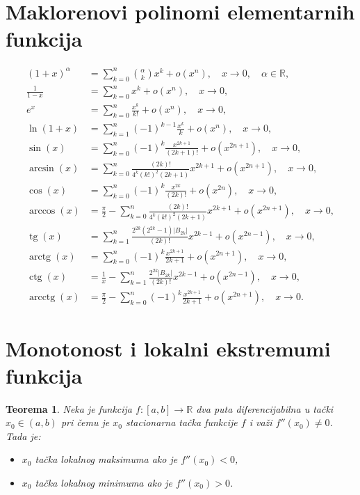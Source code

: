 \documentclass[a4paper,12pt]{article}
\theoremstyle{plain}
\newtheorem{theorem}{Teorema}[section]
\theoremstyle{definition}
\theoremstyle{remark}
\renewcommand{\tan}{\operatorname{tg}}
\renewcommand{\cot}{\operatorname{ctg}}
\renewcommand{\arctan}{\operatorname{arctg}}
\newcommand{\arccot}{\operatorname{arcctg}}
\begin{document}
\section{Maklorenovi polinomi elementarnih funkcija}
\begin{align*}
(1+x)^\alpha &= \sum_{k=0}^{n} \binom{\alpha}{k} x^k + o(x^n), \quad x \to 0, \quad \alpha \in \mathbb{R}, \\
\frac{1}{1-x} &= \sum_{k=0}^{n} x^k + o(x^n), \quad x \to 0, \\
e^x &= \sum_{k=0}^{n} \frac{x^k}{k!} + o(x^n), \quad x \to 0, \\
\ln(1+x) &= \sum_{k=1}^{n} (-1)^{k-1} \frac{x^k}{k} + o(x^n), \quad x \to 0, \\
\sin(x) &= \sum_{k=0}^{n} (-1)^k \frac{x^{2k+1}}{(2k+1)!} + o(x^{2n+1}), \quad x \to 0, \\
\arcsin(x) &= \sum_{k=0}^{n} \frac{(2k)!}{4^k (k!)^2 (2k+1)} x^{2k+1}
+ o(x^{2n+1}), \quad x \to 0, \\
\cos(x) &= \sum_{k=0}^{n} (-1)^k \frac{x^{2k}}{(2k)!} + o(x^{2n}), \quad x \to 0, \\
\arccos(x) &= \frac{\pi}{2}
- \sum_{k=0}^{n} \frac{(2k)!}{4^k (k!)^2 (2k+1)} x^{2k+1}
+ o(x^{2n+1}), \quad x \to 0, \\
\tan(x) &= \sum_{k=1}^{n}
\frac{2^{2k}(2^{2k}-1)|B_{2k}|}{(2k)!} x^{2k-1}
+ o(x^{2n-1}), \quad x \to 0, \\
\arctan(x) &= \sum_{k=0}^{n} (-1)^k \frac{x^{2k+1}}{2k+1}
+ o(x^{2n+1}), \quad x \to 0, \\
\cot(x) &= \frac{1}{x}
- \sum_{k=1}^{n}
\frac{2^{2k}|B_{2k}|}{(2k)!} x^{2k-1}
+ o(x^{2n-1}), \quad x \to 0, \\
\arccot(x) &= \frac{\pi}{2}
- \sum_{k=0}^{n} (-1)^k \frac{x^{2k+1}}{2k+1}
+ o(x^{2n+1}), \quad x \to 0.
\end{align*}

\section{Monotonost i lokalni ekstremumi funkcija}

\begin{theorem}
Neka je funkcija $f: [a, b] \to \mathbb{R}$ dva puta diferencijabilna u tački $x_0 \in (a, b)$ pri čemu je $x_0$ stacionarna tačka funkcije $f$ i važi $f''(x_0) \neq 0$. Tada je:
\begin{itemize}
    \item $x_0$ tačka lokalnog maksimuma ako je $f''(x_0) < 0$,
    \item $x_0$ tačka lokalnog minimuma ako je $f''(x_0) > 0$.
\end{itemize}
\end{theorem}
\end{document}
